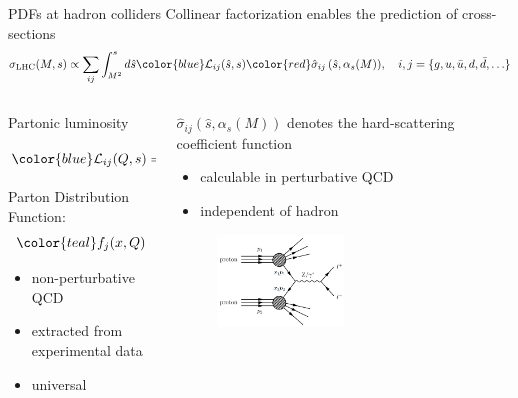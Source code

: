 \documentclass[aspectratio=169, 8pt,t]{beamer}
\begin{document}
\begin{frame}{PDFs at hadron colliders}
  Collinear factorization enables the prediction of cross-sections
  \begin{equation*}
    \sigma_{\mathrm{LHC}}(M, s) \propto \sum_{i j} \int_{M^2}^s d \hat{s} {\color{blue}\mathcal{L}_{i j}(\hat{s}, s)} {\color{red}\hat{\sigma}_{i j}\left(\hat{s}, \alpha_s(M)\right)}, \quad i,j = \{g, u, \bar{u}, d, \bar{d}, \ldots\}
  \end{equation*}

  \begin{columns}
    \begin{column}{0.49\textwidth}
      Partonic luminosity
      \begin{equation*}
        {\color{blue}\mathcal{L}_{i j}(Q, s)}=\frac{1}{s} \int_{Q^2 / s}^1 \frac{d x}{x} {\color{teal}f_i\left(\frac{Q^2}{s x}, Q\right) f_j(x, Q)}
      \end{equation*}
      Parton Distribution Function:
      \begin{equation*}
        {\color{teal} f_j(x,Q)}
      \end{equation*}
      \begin{itemize}
        \item non-perturbative QCD
        \item extracted from experimental data
        \item universal
      \end{itemize}
    \end{column}

    \begin{column}{0.49\textwidth}
      {\color{red} $\hat{\sigma}_{i j}\left(\hat{s}, \alpha_s(M)\right)$} denotes the hard-scattering coefficient function
      \begin{itemize}
        \item calculable in perturbative QCD
        \item independent of hadron
      \end{itemize}
      \begin{figure}
        \includegraphics[width=0.5\textwidth]{figures/dy.png}
      \end{figure}
    \end{column}
  \end{columns}
\end{frame}
\end{document}
